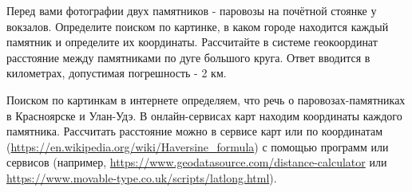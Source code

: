 

Перед вами фотографии двух памятников - паровозы на почётной стоянке у вокзалов. Определите поиском по картинке, в каком городе находится каждый памятник и определите их координаты. Рассчитайте в системе геокоординат расстояние между памятниками по дуге большого круга. Ответ вводится в километрах, допустимая погрешность - 2 км.


\explanationSection

Поиском по картинкам в интернете определяем, что речь о паровозах-памятниках в Красноярске и Улан-Удэ. В онлайн-сервисах карт находим координаты каждого памятника. Рассчитать расстояние можно в сервисе карт или по координатам (\url{https://en.wikipedia.org/wiki/Haversine_formula}) с помощью программ или сервисов (например, \url{https://www.geodatasource.com/distance-calculator} или \url{https://www.movable-type.co.uk/scripts/latlong.html}). 

